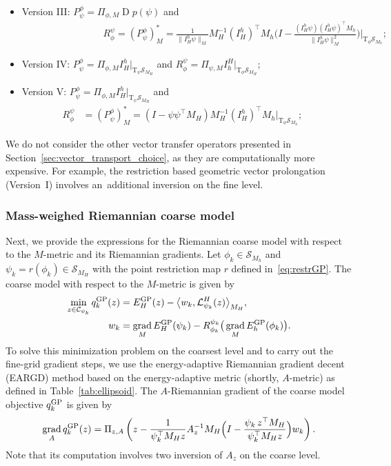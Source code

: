 \documentclass[11pt,reqno]{amsart}
\theoremstyle{plain}
\DeclareMathOperator{\Drm}{D}
\DeclareMathOperator{\grad}{grad}
\def\restr{r}
\def\prol{p}
\newcommand\calC{\mathcal C}
\newcommand\calS{\mathcal S}
\newcommand{\Tan}{\mathrm{T}}
\newcommand{\invRet}{\mathcal L}
\newcommand{\GP}{{\rm GP}}
\begin{document}
	\begin{itemize}
		\item Version III: %
		$P_\psi^{\phi} = \Pi_{\phi,M}\Drm \prol(\psi)$ and 
		\begin{align*}
			\qquad\qquad\qquad\qquad R_{\phi}^{\psi} =  (P_\psi^{\phi})^{\ast}_M 
			= \frac{1}{\|I_H^h \psi\|_M} M_{H}^{-1}(I_H^h)^\top M_{h} \bigg(I-\frac{(I_H^h \psi)(I_H^h \psi)^{\top}M_{h}}{\|I_H^h \psi\|_M^2}\bigg)\bigg|_{\Tan_{\phi}\calS_{M_h}};
		\end{align*}
		
		\item Version IV: %
		$P_{\psi}^{\phi}=\Pi_{\phi, M} I_{H}^{h}\big|_{\Tan_{\psi}\calS_{M_H}}$ and $R_{\phi}^{\psi} =\Pi_{\psi,M} I_{h}^{H}\big|_{\Tan_{\phi}\calS_{M_H}}$;
		
		\item Version V: %
		$P_{\psi}^{\phi} =\Pi_{\phi,M}I_{H}^{h}\big|_{\Tan_{\psi}\calS_{M_H}}$ and 
		\begin{align*}
			R_{\phi}^{\psi} &=(P_{\psi}^{\phi})^{\ast}_{M} = (I-\psi\psi^{\top}M_{H})M_H^{-1}(I_{H}^{h})^{\top}M_{h}\big|_{\Tan_{\phi}\calS_{M_h}}; \quad
		\end{align*}
	\end{itemize}
	We do not consider the other vector transfer operators presented in Section~\ref{sec:vector_transport_choice}, as they are computationally more expensive. For example, the restriction based geometric vector prolongation (Version~I) involves an~additional inversion on the fine level. 
	
	\subsubsection{Mass-weighed Riemannian coarse model}
	\label{subsec:geom-coarse}
	Next, we provide the expressions for the Riemannian coarse model with respect to the $M$-metric and its Riemannian gradients. 
	Let $\phi_{k}\in\mathcal{S}_{M_h}$ and $\psi_k=r(\phi_{k})\in\mathcal{S}_{M_H}$ with the point restriction map $\restr$ defined in~\eqref{eq:restrGP}. The coarse model with respect to the $M$-metric is given by
	\begin{align*}
		\min_{z\in\calC_{\psi_k}}q_{k}^{\GP}(z) 
		& =E_{H}^{\GP}(z)-\big\langle w_{k},\invRet_{\psi_k}^H(z)\big\rangle_{M_H},  \\
		w_{k} & =\grad_M E_{H}^{\GP}(\psi_k) - R_{\phi_{k}}^{\psi_k}\big(\grad_M E_{h}^{\GP}(\phi_{k})\big). 
		\notag
	\end{align*}
	To solve this minimization problem on the coarsest level and to carry out the fine-grid gradient steps, we use the energy-adaptive Riemannian gradient decent (EARGD) method \cite{HenP20} based on the energy-adaptive metric (shortly, $A$-metric) as defined in Table~\ref{tab:ellipsoid}. The $A$-Riemannian gradient of the coarse model objective $q_k^{\GP}$ is given by  
	\[
	\grad_{A} q_k^{\GP}(z) 
	= \Pi_{z,A}\left(z - \frac{1}{\psi_k^\top M_{H}z} A_z^{-1}M_H\Big(I- \frac{\psi_k\,z^\top M_H}{\psi_k^\top M_Hz}\Big) w_k\right).
	\]
	Note that its computation involves two inversion of $A_{z}$ on the coarse level.
	
\end{document}
